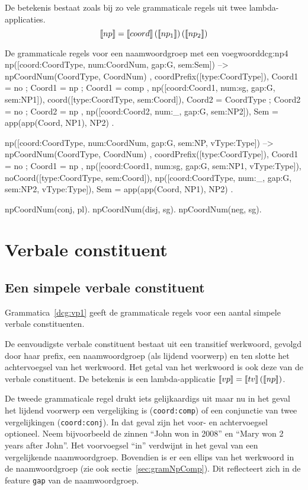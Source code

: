 De betekenis bestaat zoals bij zo vele grammaticale regels uit twee lambda-applicaties. $$\llbracket np\rrbracket = \llbracket coord\rrbracket \left( \llbracket np_1\rrbracket \right) \left( \llbracket np_2\rrbracket \right)$$

\begin{dcg}{De grammaticale regels voor een naamwoordgroep met een voegwoord}{dcg:np4}
np([coord:CoordType, num:CoordNum, gap:G, sem:Sem]) -->
  { npCoordNum(CoordType, CoordNum) },
  coordPrefix([type:CoordType]),
  { Coord1 = no ; Coord1 = np ; Coord1 = comp },
  np([coord:Coord1, num:sg, gap:G, sem:NP1]),
  coord([type:CoordType, sem:Coord]),
  { Coord2 = CoordType ; Coord2 = no ; Coord2 = np },
  np([coord:Coord2, num:_, gap:G, sem:NP2]),
  { Sem = app(app(Coord, NP1), NP2) }.

np([coord:CoordType, num:CoordNum, gap:G, sem:NP, vType:Type]) -->
  { npCoordNum(CoordType, CoordNum) },
  coordPrefix([type:CoordType]),
  { Coord1 = no ; Coord1 = np },
  np([coord:Coord1, num:sg, gap:G, sem:NP1, vType:Type]),
  noCoord([type:CoordType, sem:Coord]),
  np([coord:CoordType, num:_, gap:G, sem:NP2, vType:Type]),
  { Sem = app(app(Coord, NP1), NP2) }.

npCoordNum(conj, pl).
npCoordNum(disj, sg).
npCoordNum(neg, sg).
\end{dcg}

\section{Verbale constituent}
\subsection{Een simpele verbale constituent}
Grammatica~\ref{dcg:vp1} geeft de grammaticale regels voor een aantal simpele verbale constituenten.

De eenvoudigste verbale constituent bestaat uit een transitief werkwoord, gevolgd door haar prefix, een naamwoordgroep (als lijdend voorwerp) en ten slotte het achtervoegsel van het werkwoord. Het getal van het werkwoord is ook deze van de verbale constituent. De betekenis is een lambda-applicatie $\llbracket vp\rrbracket = \llbracket tv\rrbracket \left( {\llbracket np\rrbracket} \right)$.

De tweede grammaticale regel drukt iets gelijkaardigs uit maar nu in het geval het lijdend voorwerp een vergelijking is (\texttt{coord:comp}) of een conjunctie van twee vergelijkingen (\texttt{coord:conj}). In dat geval zijn het voor- en achtervoegsel optioneel. Neem bijvoorbeeld de zinnen ``John won in 2008'' en ``Mary won 2 years after John''. Het voorvoegsel ``in'' verdwijnt in het geval van een vergelijkende naamwoordgroep. Bovendien is er een ellips van het werkwoord in de naamwoordgroep (zie ook sectie~\ref{sec:gramNpComp}). Dit reflecteert zich in de feature \texttt{gap} van de naamwoordgroep. 

